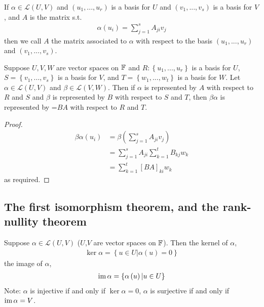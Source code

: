 \documentclass[a4paper]{article}
\begin{document}
\begin{defi}
If $\alpha \in \mathcal{L}\left(U,V\right)$ and $\left(u_1,...,u_r\right)$ is a basis for $U$ and $\left(v_1,...,v_s\right)$ is a basis for $V$, and $A$ is the matrix s.t.
\begin{equation*}
\begin{aligned}
\alpha\left(u_i\right) = \sum_{j=1}^s A_{ji} v_j
\end{aligned}
\end{equation*}
then we call $A$ the matrix associated to $\alpha$ with respect to the basis $\left(u_1,...,u_r\right)$ and $\left(v_1,...,v_s\right)$.
\end{defi}

\begin{lemma}
Suppose $U,V,W$ are vector spaces on $\mathbb{F}$ and $R:\left\{u_1,...,u_r\right\}$ is a basis for $U$, $S = \left\{v_1,...,v_s\right\}$ is a basis for $V$, and $T = \left\{w_1,...,w_t\right\}$ is a basis for $W$. Let $\alpha\in\mathcal{L}\left(U,V\right)$ and $\beta\in\mathcal{L}\left(V,W\right)$. Then if $\alpha$ is represented by $A$ with respect to $R$ and $S$ and $\beta$ is represented by $B$ with respect to $S$ and $T$, then $\beta\alpha$ is represented by =$BA$ with respect to $R$ and $T$.
\begin{proof}
\begin{equation*}
\begin{aligned}
\beta\alpha\left(u_i\right) &= \beta\left(\sum_{j=1}^s A_{ji}v_j\right)\\
&= \sum_{j=1}^s A_{ji} \sum_{k=1}^t B_{kj} w_k\\
&= \sum_{k=1}^t \left[BA\right]_{ki} w_k
\end{aligned}
\end{equation*}
as required.
\end{proof}
\end{lemma}

\subsection{The first isomorphism theorem, and the rank-nullity theorem}
\begin{defi}
Suppose $\alpha\in\mathcal{L}\left(U,V\right)$ ($U$,$V$ are vector spaces on $\mathbb{F}$). Then the kernel of $\alpha$, 
\begin{equation*}
\begin{aligned}
\ker\alpha = \left\{u\in U | \alpha\left(u\right) = 0\right\}
\end{aligned}
\end{equation*}
the image of $\alpha$, 
\begin{equation*}
\begin{aligned}
\operatorname{im}\alpha = \left\{\alpha\left(u\right) | u\in U\right\}
\end{aligned}
\end{equation*}
Note: $\alpha$ is injective if and only if $\ker \alpha = 0$, $\alpha$ is surjective if and only if $\operatorname{im}\alpha = V$.
\end{defi}
\end{document}
